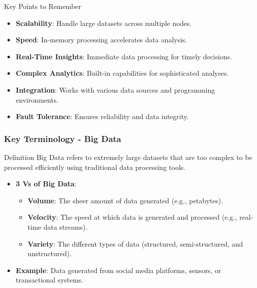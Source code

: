 \documentclass[aspectratio=169]{beamer}
\begin{document}
\begin{frame}[fragile]{Key Points to Remember}
    \begin{itemize}
        \item \textbf{Scalability}: Handle large datasets across multiple nodes.
        \item \textbf{Speed}: In-memory processing accelerates data analysis.
        \item \textbf{Real-Time Insights}: Immediate data processing for timely decisions.
        \item \textbf{Complex Analytics}: Built-in capabilities for sophisticated analyses.
        \item \textbf{Integration}: Works with various data sources and programming environments.
        \item \textbf{Fault Tolerance}: Ensures reliability and data integrity.
    \end{itemize}
\end{frame}

\begin{frame}[fragile]
    \frametitle{Key Terminology - Big Data}
    \begin{block}{Definition}
        Big Data refers to extremely large datasets that are too complex to be processed efficiently using traditional data processing tools.
    \end{block}
    \pause
    \begin{itemize}
        \item \textbf{3 Vs of Big Data}:
        \begin{itemize}
            \item \textbf{Volume}: The sheer amount of data generated (e.g., petabytes).
            \item \textbf{Velocity}: The speed at which data is generated and processed (e.g., real-time data streams).
            \item \textbf{Variety}: The different types of data (structured, semi-structured, and unstructured).
        \end{itemize}
        \item \textbf{Example}: Data generated from social media platforms, sensors, or transactional systems.
    \end{itemize}
\end{frame}
\end{document}

